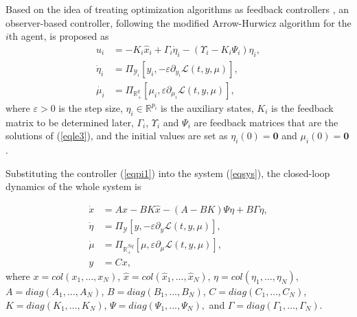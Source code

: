 \documentclass[final,5p,times,twocolumn,authoryear]{elsarticle}
\begin{document}
	 Based on the idea of treating optimization algorithms as feedback controllers \citep{hau2021}, an observer-based controller, following the modified Arrow-Hurwicz algorithm \citep{AH1958} for the $i$th agent, is proposed as
	\begin{subequations}\label{eqpi1}
		\begin{align}
			u_i&=-K_{i} \hat{x}_i+\Gamma_i\dot{\eta}_i - (\Upsilon_i - K_i\Psi_i)\eta_i, \label{eqpi1a}\\
			\dot{\eta}_i&=\Pi_{\mathcal{Y}_i}[y_i, -\varepsilon \partial_{y_i}\mathcal{L}(t,y,\mu)],\label{eqpi1b}\\
			\dot{\mu_i}&=\Pi_{\mathbb{R}_+^q}[\mu_i,\varepsilon \partial_{\mu_i}\mathcal{L}(t,y,\mu)], \label{eqpi1c}
		\end{align}
	\end{subequations}
	where $\varepsilon>0$ is the step size, $\eta_i\in\mathbb{R}^{p_i}$ is the auxiliary states, $K_i$ is the feedback matrix to be determined later, $\Gamma_i$, $\Upsilon_i$ and $\Psi_i$ are feedback matrices that are the solutions of (\ref{eqle3}), and the initial values are set as $\eta_i(0){=}\boldsymbol{0}$ and $\mu_i(0){=}\boldsymbol{0}$.
	
	
	Substituting the controller (\ref{eqpi1}) into the system (\ref{eqsys}), the closed-loop dynamics of the whole system is
	
	\begin{subequations}\label{eqpi2}
		\begin{align}
			\dot x&{=}Ax-BK\hat x-(A{-}B K)\Psi\eta{+}B\Gamma \dot{\eta}, \label{eqpi2a}\\
			\dot{\eta}&{=}\Pi_{\mathcal{Y}}[y, -\varepsilon \partial_{y}\mathcal{L}(t,y,\mu)],\label{eqpi2b}\\
			\dot{\mu}&{=}\Pi_{\mathbb{R}_+^{Nq}}[\mu,\varepsilon \partial_{\mu}\mathcal{L}(t,y,\mu)] ,\label{eqpi2c}\\
			y&{=}Cx,\label{eqpi2d}
		\end{align}
	\end{subequations}
	where $x {=} col(x_1,\dots,x_N)$, $\hat x {=} col(\hat x_1,\dots,\hat x_N)$, $\eta {=} col(\eta_1,\dots,\eta_N)$, $A {=} diag(A_1,\!\dots\!,A_N)$, $B {=} diag(B_1, \!\dots\!, B_N)$, $C {=} diag(C_1, \!\dots\!, C_N)$, $K = diag(K_{\!1}, \!\dots\!,\! K_{\!N})$, $\Psi {=} diag(\Psi_{\!1}, \!\dots\!,\!\! \Psi_{\!N}),\!$ and $\Gamma{=}diag(\Gamma_{\!1}, \!\dots\!,\! \Gamma_{\!N}\!)$.
	
\end{document}
